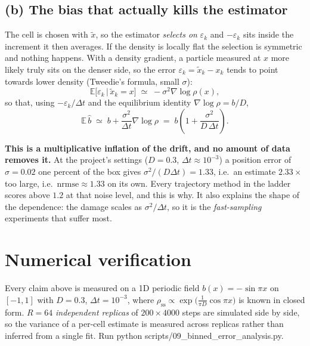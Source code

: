 \documentclass[11pt,a4paper]{article}
\newcommand{\code}[1]{{\ttfamily\small #1}}
\newcommand{\dt}{\Delta t}
\newcommand{\E}{\mathbb{E}}
\begin{document}
\subsection{(b) The bias that actually kills the estimator}

The cell is chosen with $\tilde x$, so the estimator \emph{selects on} $\varepsilon_k$
\textemdash{} and $-\varepsilon_k$ sits inside the increment it then averages. If the
density is locally flat the selection is symmetric and nothing happens. With a density
gradient, a particle measured at $x$ more likely truly sits on the denser side, so the
error $\varepsilon_k=\tilde x_k-x_k$ tends to point towards lower density (Tweedie's
formula, small $\sigma$):
\begin{equation}
  \E\big[\varepsilon_k \,\big|\, \tilde x_k = x\big] \;\simeq\; -\sigma^{2}\nabla\log\rho(x) ,
\end{equation}
so that, using $-\varepsilon_k/\dt$ and the equilibrium identity $\nabla\log\rho = b/D$,
\begin{equation}\boxed{
  \E\,\hat b \;\simeq\; b + \frac{\sigma^{2}}{\dt}\nabla\log\rho
  \;=\; b\left(1+\frac{\sigma^{2}}{D\,\dt}\right) .
  \label{eq:inflation}
}\end{equation}

\begin{warnbox}
\textbf{This is a multiplicative inflation of the drift, and no amount of data removes it.}
At the project's settings ($D=0.3$, $\dt\approx10^{-3}$) a position error of
$\sigma=0.02$ \textemdash{} one percent of the box \textemdash{} gives
$\sigma^{2}/(D\dt)=1.33$, i.e.\ an estimate $2.33\times$ too large, i.e.\
$\mathrm{nrmse}\approx1.33$ on its own. Every trajectory method in the ladder scores
above $1.2$ at that noise level, and this is why. It also explains the shape of the
dependence: the damage scales as $\sigma^{2}/\dt$, so it is the \emph{fast-sampling}
experiments that suffer most.
\end{warnbox}

\section{Numerical verification}

Every claim above is measured on a 1D periodic field $b(x)=-\sin\pi x$ on $[-1,1]$
with $D=0.3$, $\dt=10^{-3}$, where $\rho_{\mathrm{ss}}\propto
\exp\!\big(\tfrac{1}{\pi D}\cos\pi x\big)$ is known in closed form.
$R=64$ \emph{independent replicas} of $200\times4000$ steps are simulated side by side,
so the variance of a per-cell estimate is measured across replicas rather than inferred
from a single fit. Run \code{python scripts/09\_binned\_error\_analysis.py}.
\end{document}
